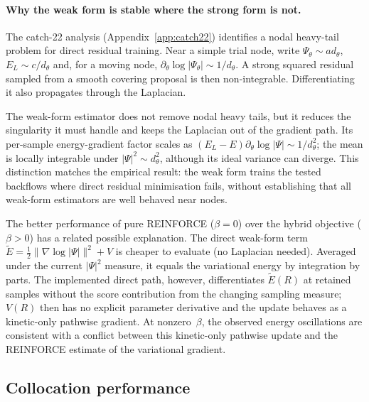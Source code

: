 \paragraph{Why the weak form is stable where the strong form is not.}
\label{sec:colloc-why-reinforce}

The catch-22 analysis (Appendix~\ref{app:catch22}) identifies a nodal heavy-tail problem for
direct residual training. Near a simple trial node, write
$\Psi_\theta\sim a d_\theta$, $E_L\sim c/d_\theta$ and, for a moving node,
$\partial_\theta\log|\Psi_\theta|\sim1/d_\theta$. A strong squared residual sampled from a
smooth covering proposal is then non-integrable. Differentiating it also propagates through
the Laplacian.

The weak-form estimator does not remove nodal heavy tails, but it reduces the singularity it
must handle and keeps the Laplacian out of the gradient path. Its per-sample energy-gradient
factor scales as $(E_L-E)\partial_\theta\log|\Psi|\sim1/d_\theta^2$; the mean is locally
integrable under $|\Psi|^2\sim d_\theta^2$, although its ideal variance can diverge. This
distinction matches the empirical result: the weak form trains the tested backflows where
direct residual minimisation fails, without establishing that all weak-form estimators are
well behaved near nodes.

The better performance of pure REINFORCE ($\beta{=}0$) over the hybrid
objective ($\beta{>}0$) has a related possible explanation.
The direct weak-form term $\tilde{E} = \tfrac{1}{2}\|\nabla\log|\Psi|\|^2 + V$
is cheaper to evaluate (no Laplacian needed). Averaged under the current
$|\Psi|^2$ measure, it equals the variational energy by integration by parts.
The implemented direct path, however, differentiates $\tilde E(R)$ at retained
samples without the score contribution from the changing sampling measure; $V(R)$
then has no explicit parameter derivative and the update behaves as a kinetic-only
pathwise gradient.
At nonzero~$\beta$, the observed energy oscillations are consistent with a conflict between
this kinetic-only pathwise update and the REINFORCE estimate of the variational gradient.

\subsection{Collocation performance}
\label{sec:colloc-results}

